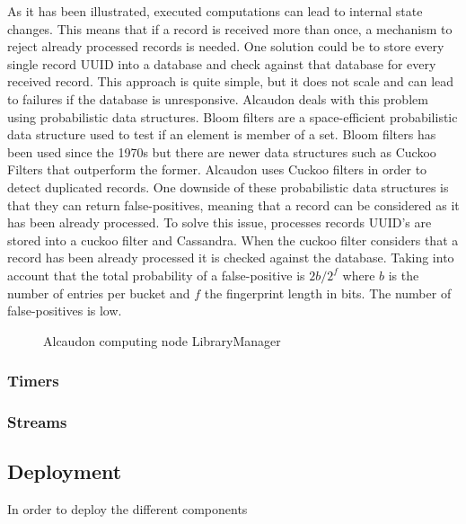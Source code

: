 As it has been illustrated, executed computations can lead to internal state
changes. This means that if a record is received more than once, a mechanism to
reject already processed records is needed. One solution could be to store every
single record \acs{UUID} into a database and check against that database for
every received record. This approach is quite simple, but it does not scale and
can lead to failures if the database is unresponsive. Alcaudon deals with this
problem using probabilistic data structures. Bloom filters are a space-efficient
probabilistic data structure used to test if an element is member of a set.
Bloom filters has been used since the 1970s but there are newer data structures
such as Cuckoo Filters\cite{cuckoo} that outperform the former. Alcaudon uses
Cuckoo filters in order to detect duplicated records. One downside of these
probabilistic data structures is that they can return false-positives, meaning
that a record can be considered as it has been already processed. To solve this
issue, processes records \acs{UUID}'s are stored into a cuckoo filter and
Cassandra. When the cuckoo filter considers that a record has been already
processed it is checked against the database. Taking into account that the total
probability of a false-positive is $2b/2^{f}$ where $b$ is the number of entries
per bucket and $f$ the fingerprint length in bits. The number of false-positives
is low.

\begin{figure}[!h]
  \centering
  \scalebox{0.45}{
    
  }
  \caption{Alcaudon computing node LibraryManager}
  \label{fig:recordprocessing}
\end{figure}

\subsubsection{Timers}
\subsubsection{Streams}
\subsection{Deployment}

In order to deploy the different components

